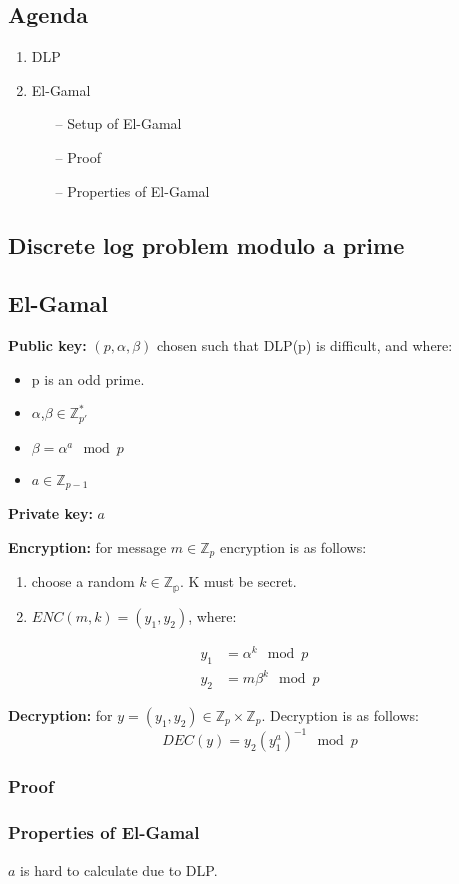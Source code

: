 

\subsection*{Agenda}
\begin{enumerate}
\item DLP
\item El-Gamal
  \begin{itemize}
  \item [--]Setup of El-Gamal
  \item [--]Proof
  \item [--]Properties of El-Gamal
  \end{itemize}
\end{enumerate}


\subsection{Discrete log problem modulo a prime}


\subsection{El-Gamal}
\textbf{Public key:} $(p,\alpha,\beta)$ chosen such that DLP(p) is
difficult, and where:
\begin{itemize}
\item p is an odd prime.
\item $\alpha$,$\beta \in \mathbb{Z}_{p'}^*$
\item $\beta = \alpha^a \mod p$
\item $a \in \mathbb{Z}_{p-1} $
\end{itemize}

\textbf{Private key:} $a$

\textbf{Encryption:} for message $m \in \mathbb{Z}_p$ encryption is as
follows:
\begin{enumerate}
\item choose a random $k \in \mathbb{Z_p}$. K must be secret.
\item $ENC(m,k) = (y_1,y_2)$, where:
\end{enumerate}
\begin{align*}
  y_1 &= \alpha^k \mod p\\
  y_2 &= m\beta^k \mod p
\end{align*}

\textbf{Decryption:} for $y = (y_1,y_2) \in \mathbb{Z}_p \times \mathbb{Z}_p$. Decryption is as follows:
\[DEC(y) = y_2(y_1^a)^{-1} \mod p\]

\subsubsection*{Proof}

\subsubsection*{Properties of El-Gamal}
$a$ is hard to calculate due to DLP.

